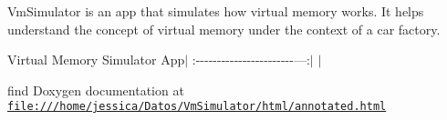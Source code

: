 Vm\+Simulator is an app that simulates how virtual memory works. It helps understand the concept of virtual memory under the context of a car factory.

Virtual Memory Simulator App$\vert$ \+:-\/-\/-\/-\/-\/-\/-\/-\/-\/-\/-\/-\/-\/-\/-\/-\/-\/-\/-\/-\/-\/-\/-\/---\+:$\vert$  $\vert$

find Doxygen documentation at \href{file:///home/jessica/Datos/VmSimulator/html/annotated.html}{\tt file\+:///home/jessica/\+Datos/\+Vm\+Simulator/html/annotated.\+html} 